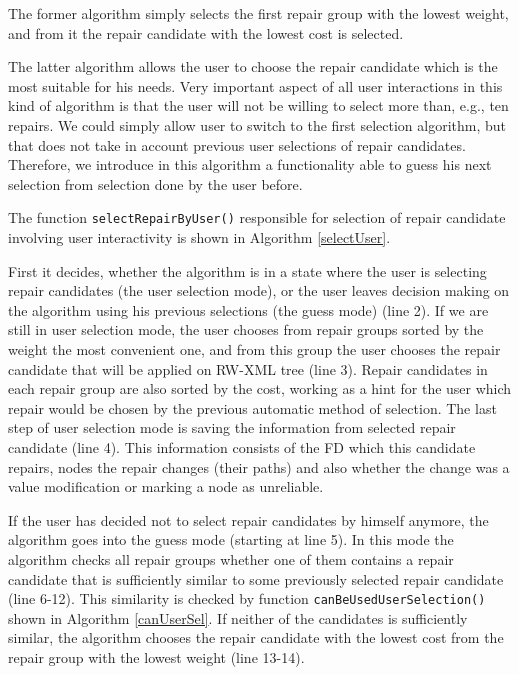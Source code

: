 The former algorithm simply selects the first repair group with the lowest weight, and from it the repair candidate with the lowest cost is selected.

The latter algorithm allows the user to choose the repair candidate which is the most suitable for his needs. Very important aspect of all user interactions in this kind of algorithm is that the user will not be willing to select more than, e.g., ten repairs. We could simply allow user to switch to the first selection algorithm, but that does not take in account previous user selections of repair candidates. Therefore, we introduce in this algorithm a functionality able to guess his next selection from selection done by the user before.

The function \texttt{selectRepairByUser()} responsible for selection of repair candidate involving user interactivity is shown in Algorithm \ref{selectUser}.

First it decides, whether the algorithm is in a state where the user is selecting repair candidates (the user selection mode), or the user leaves decision making on the algorithm using his previous selections (the guess mode) (line 2). If we are still in user selection mode, the user chooses from repair groups sorted by the weight the most convenient one, and from this group the user chooses the repair candidate that will be applied on RW-XML tree (line 3). Repair candidates in each repair group are also sorted by the cost, working as a hint for the user which repair would be chosen by the previous automatic method of selection. The last step of user selection mode is saving the information from selected repair candidate (line 4). This information consists of the FD which this candidate repairs, nodes the repair changes (their paths) and also whether the change was a value modification or marking a node as unreliable.

If the user has decided not to select repair candidates by himself anymore, the algorithm goes into the guess mode (starting at line 5). In this mode the algorithm checks all repair groups whether one of them contains a repair candidate that is sufficiently similar to some previously selected repair candidate (line 6-12). This similarity is checked by function \texttt{canBeUsedUserSelection()} shown in Algorithm \ref{canUserSel}. If neither of the candidates is sufficiently similar, the algorithm chooses the repair candidate with the lowest cost from the repair group with the lowest weight (line 13-14).

